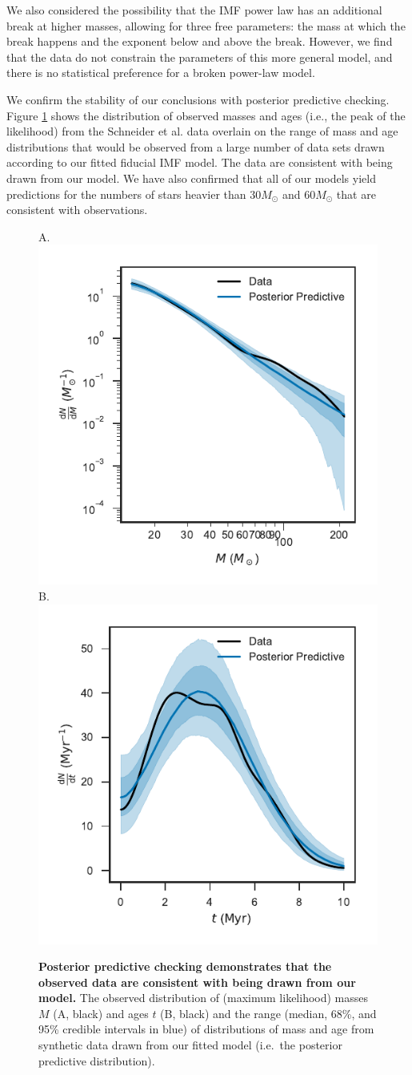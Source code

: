 \documentclass[12pt]{article}
\begin{document}
We also considered the possibility that the IMF power law has an additional break at higher masses, allowing for three free parameters: the mass at which the break happens and the exponent below and above the break.  However, we find that the data do not constrain the parameters of this more general model, and there is no statistical preference for a broken power-law model.

We confirm the stability of our conclusions with posterior predictive checking.
Figure \ref{fig:PPC} shows the distribution of observed masses and ages (i.e.,
the peak of the likelihood) from the Schneider et al.\cite{Schneider:2018} data overlain on the
range of mass and age distributions that would be observed from a large number
of data sets drawn according to our fitted fiducial IMF model.  The data are consistent with being drawn from our model.  We have also confirmed that all of our models yield predictions for the numbers of stars heavier than $30 M_\odot$ and $60 M_\odot$ that are consistent with observations.

\begin{figure}
    		    A.\\		\includegraphics[width=0.5\columnwidth]{dNdm-ppc-band.pdf}\\
               B.\\  \includegraphics[width=0.5\columnwidth]{dNdt-ppc-band.pdf}
    		\caption{{\bf Posterior predictive checking demonstrates that the observed data are consistent with being drawn from our model.} The observed distribution of (maximum likelihood) masses $M$ (A, black) and ages $t$ (B, black) and the range (median, 68\%, and 95\% credible intervals in blue) of distributions of mass and age from synthetic data drawn from our fitted model (i.e.\ the posterior predictive distribution).}\label{fig:PPC}
\end{figure}
\end{document}
